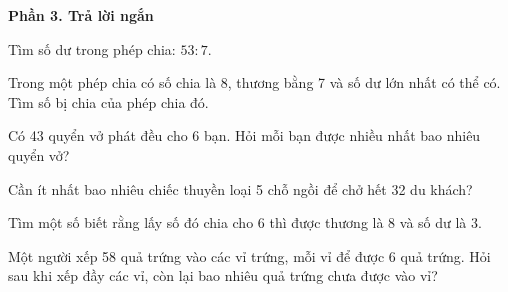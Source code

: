 \textbf{Phần 3. Trả lời ngắn}

\begin{ex} %
Tìm số dư trong phép chia: $53 : 7$.
\end{ex}

\begin{ex} %
Trong một phép chia có số chia là 8, thương bằng 7 và số dư lớn nhất có thể có. Tìm số bị chia của phép chia đó.
\end{ex}

\begin{ex} %
Có 43 quyển vở phát đều cho 6 bạn. Hỏi mỗi bạn được nhiều nhất bao nhiêu quyển vở?
\end{ex}

\begin{ex} %
Cần ít nhất bao nhiêu chiếc thuyền loại 5 chỗ ngồi để chở hết 32 du khách?
\end{ex}

\begin{ex} %
Tìm một số biết rằng lấy số đó chia cho 6 thì được thương là 8 và số dư là 3.
\end{ex}

\begin{ex} %
Một người xếp 58 quả trứng vào các vỉ trứng, mỗi vỉ để được 6 quả trứng. Hỏi sau khi xếp đầy các vỉ, còn lại bao nhiêu quả trứng chưa được vào vỉ?
\end{ex}
